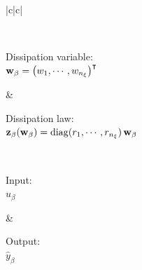 \documentclass[10pt,a4paper]{article}
\begin{document}
{\begin{table}[h!]
\begin{tabular}[c]{|c|c|}
\begin{minipage}[c|]{6cm}
  \end{minipage}
    \\
    \hline
   \begin{minipage}[c|]{5cm}
\vspace{0.2em}
\centering Dissipation variable:\\ $
	{\mathbf{w}}_\beta = \left(w_1,\cdots,w_{n_\xi}\right)^\intercal
        $\\ \vspace{0.2em}
  \end{minipage}
    &\begin{minipage}[c|]{5cm}
\vspace{0.5em}
\centering
Dissipation law:\\ ${\mathbf{z}}_\beta({\mathbf{w}}_\beta) = \operatorname{diag}(r_1,\cdots,r_{n_\xi})\,{\mathbf{w}}_\beta$
\\ \vspace{0.2em}
  \end{minipage}
    \\
    \hline    
    \begin{minipage}[c|]{5cm}
\vspace{0.2em}
\centering
Input:\\
$ u_\beta $\\ \vspace{0.2em} 
  \end{minipage} & \begin{minipage}[c|]{5cm}
\vspace{0.5em}
\centering
Output:\\
$\widehat y_\beta$\\ \vspace{0.2em} 
  \end{minipage}
    \\
    \hline
\\
    \hline
  \end{tabular}
  \caption{\label{tab:frac_int} Port-Hamiltonian formulation (\ref{eq:PHS}) for the approximation of the fractional integrator $y_\beta(s)=(p s^\beta)^{-1} u_\beta(s)$ on a finite set of $\npoles$ poles. The parameters $p_n, r_n$ for $n \in (1,\cdots \npoles)$ are defined in (\ref{eq:frac_int_parameters}) based on the minimization of (\ref{eq:ObjectiveFunctionNum}). As an example, if $u_\beta\equiv i$ and $y_\beta \equiv v$, this structure corresponds to the serial connection of $\npoles$ parallel RC cells; if $y_\beta\equiv i$ and $u_\beta \equiv v$, this structure corresponds to the parallel connection of $\npoles$ serial LC cells.}

\end{table}}
\end{document}
